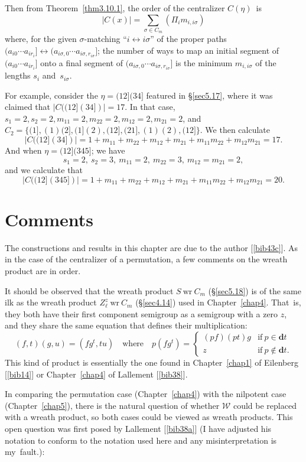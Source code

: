 \documentclass{surv-l}
\numberwithin{equation}{section}
\numberwithin{table}{section}
\numberwithin{figure}{section}
\theoremstyle{plain}
\theoremstyle{definition}
\begin{document}
Then from Theorem~\ref{thm3.10.1}, the order of the centralizer
$C(\eta)$~is
\[
|C(x)|=\sum_{\sigma\in C_{m}}(\Pi_{i}m_{i,i\sigma})
\]
where, for the given $\sigma$-matching ``$i\leftrightarrow
i\sigma$'' of the proper paths $(a_{i0}\cdots
a_{ir_{i}}]\leftrightarrow (a_{i\sigma,0}\cdots
a_{i\sigma,r_{i\sigma}}]$; the number of ways to map an initial
segment of $(a_{i0}\cdots a_{ir_{i}}]$ onto a final segment of
$(a_{i\sigma,0}\cdots a_{i\sigma,r_{i\sigma}}]$ is the minimum
$m_{i,i\sigma}$ of the lengths $s_{i}$ and~$s_{i\sigma}$.

For example, consider the $\eta=(12](34]$ featured in
\S\ref{sec5.17}, where it was claimed that $|C((12](34])|=17$. In
that case, $s_{1}=2, s_{2}=2, m_{11}=2, m_{22}= 2, m_{12}=2,
m_{21}=2$, and $C_{2}=\{(1], (1)(2], (1](2), (12], (21], (1)(2),
(12]\}$. We then calculate
\[
|C((12](34])|=1+m_{11}+m_{22}+m_{12}+m_{21}+m_{11}m_{22}+m_{12}m_{21}=17.
\]
And when $\eta=(12](345]$; we have
\[
s_{1}=2,\ s_{2}=3,\ m_{11}=2,\ m_{22}=3,\ m_{12}=m_{21}=2,
\]
and we calculate that
\[
|C((12](345])|=1+m_{11}+m_{22}+m_{12}+m_{21}+m_{11}m_{22}+m_{12}m_{21}=20.
\]

\section{Comments}\label{sec5.23}

The constructions and results in this chapter are due to the
author [\ref{bib43c}]. As in the case of the
centralizer of a permutation, a few comments on the wreath product
are in order.

It should be observed that the wreath product $S\ \mathrm{wr}\
C_{m}$ (\S\ref{sec5.18}) is of the same ilk as the wreath product
$Z_{\ell}^{z}\ \mathrm{wr}\ C_{m}$ (\S\ref{sec4.14}) used in
Chapter~\ref{chap4}. That~is, they both have their first component
semigroup as a semigroup with a zero $z$, and they share the same
equation that defines their multiplication:\index{multiplication}
\[
(f, t)(g,u) =(fg^{t}, tu)\quad \mathrm{where}\quad
p(fg^{t})=\begin{cases}
(pf)(pt)g &\mathrm{if}\ p\in \mathbf{d}t \\
z &\mathrm{if}\ p\not\in \mathbf{d}t.
\end{cases}
\]
This kind of product is essentially the one found in
Chapter~\ref{chap1} of Eilenberg
[\ref{bib14}] or Chapter~\ref{chap4} of
Lallement [\ref{bib38}].

In comparing the permutation case (Chapter~\ref{chap4}) with the
nilpotent case (Chapter~\ref{chap5}), there is the natural
question of whether $\mathcal{W}$ could be replaced with a wreath
product, so both cases could be viewed as wreath products. This
open question was first posed by Lallement
[\ref{bib38a}] (I have adjusted his notation to
conform to the notation used here and any misinterpretation is
my~fault.):
\end{document}
